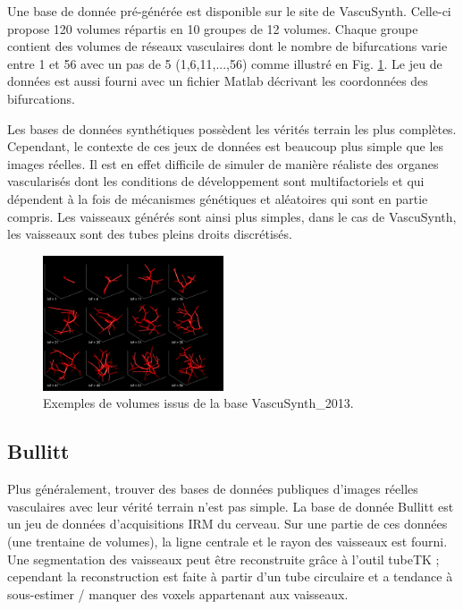 Une base de donnée pré-générée est disponible sur le site de VascuSynth. Celle-ci propose 120 volumes répartis en 10 groupes de 12 volumes. Chaque groupe contient des volumes de réseaux vasculaires dont le nombre de bifurcations varie entre 1 et 56 avec un pas de 5 (1,6,11,...,56) comme illustré en Fig. \ref{fig:VascuSynth}. Le jeu de données est aussi fourni avec un fichier Matlab décrivant les coordonnées des bifurcations.

Les bases de données synthétiques possèdent les vérités terrain les plus complètes. Cependant, le contexte de ces jeux de données est beaucoup plus simple que les images réelles. Il est en effet difficile de simuler de manière réaliste des organes vascularisés dont les conditions de développement sont multifactoriels et qui dépendent à la fois de mécanismes génétiques et aléatoires qui sont en partie compris. Les vaisseaux générés sont ainsi plus simples, dans le cas de VascuSynth, les vaisseaux sont des tubes pleins droits discrétisés.

\begin{figure}
    \centering
    \includegraphics[height=4cm]{Images/snapVascu.png}
    \caption{Exemples de volumes issus de la base VascuSynth\_2013.}
    \label{fig:VascuSynth}
\end{figure}

\subsection{Bullitt}

Plus généralement, trouver des bases de données publiques d'images réelles vasculaires avec leur vérité terrain n'est pas simple. La base de donnée Bullitt est un jeu de données d'acquisitions IRM du cerveau. Sur une partie de ces données (une trentaine de volumes), la ligne centrale et le rayon des vaisseaux est fourni. Une segmentation des vaisseaux peut être reconstruite grâce à l'outil tubeTK ; cependant la reconstruction est faite à partir d'un tube circulaire et a tendance à sous-estimer / manquer des voxels appartenant aux vaisseaux.


